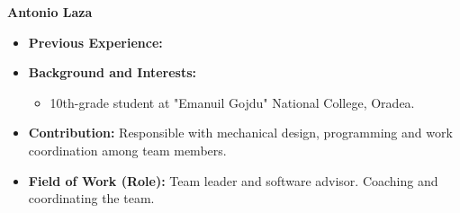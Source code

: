 \item[] \textbf{Antonio Laza}
    \begin{itemize}[label=]
        \item[\faCogs] \textbf{Previous Experience:} 
        \item[\faGraduationCap] \textbf{Background and Interests:} 
        \begin{itemize}[label=\textbullet]
            \item 10th-grade student at "Emanuil Gojdu" National College, Oradea.
        \end{itemize}
        \item[\faEdit] \textbf{Contribution:} Responsible with mechanical design, programming and work coordination among team members.
        \item[\faMicroscope] \textbf{Field of Work (Role):} Team leader and software advisor. Coaching and coordinating the team.
    \end{itemize}
    \vspace{0.2 cm}
    